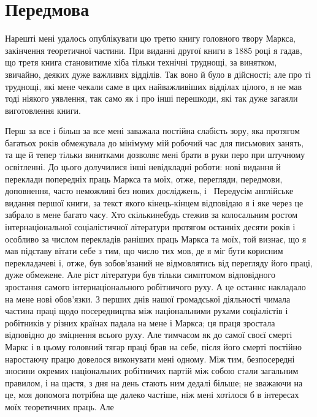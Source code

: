 \section*{Передмова}

Нарешті мені удалось опублікувати цю третю книгу головного
твору Маркса, закінчення теоретичної частини. При виданні
другої книги в 1885 році я гадав, що третя книга становитиме
хіба тільки технічні труднощі, за винятком, звичайно, деяких
дуже важливих відділів. Так воно й було в дійсності; але про ті
труднощі, які мене чекали саме в цих найважливіших відділах
цілого, я не мав тоді ніякого уявлення, так само як і про інші
перешкоди, які так дуже загаяли виготовлення книги.

Перш за все і більш за все мені заважала постійна слабість
зору, яка протягом багатьох років обмежувала до мінімуму мій
робочий час для письмових занять, та ще й тепер тільки винятками
дозволяє мені брати в руки перо при штучному освітленні.
До цього долучилися інші невідкладні роботи: нові видання й
переклади попередніх праць Маркса та моїх, отже, перегляди,
передмови, доповнення, часто неможливі без нових досліджень,
і~ Передусім англійське видання першої книги, за текст
якого кінець-кінцем відповідаю я і яке через це забрало в мене
багато часу. Хто скількинебудь стежив за колосальним ростом
інтернаціональної соціалістичної літератури протягом останніх
десяти років і особливо за числом перекладів раніших праць
Маркса та моїх, той визнає, що я мав підставу вітати себе
з тим, що число тих мов, де я міг бути корисним перекладачеві
і, отже, був зобов’язаний не відмовлятись від перегляду його
праці, дуже обмежене. Але ріст літератури був тільки симптомом
відповідного зростання самого інтернаціонального робітничого
руху. А це останнє накладало на мене нові обов’язки.
З перших днів нашої громадської діяльності чимала частина праці
щодо посередництва між національними рухами соціалістів і робітників
у різних країнах падала на мене і Маркса; ця праця зростала
відповідно до зміцнення всього руху. Але тимчасом як
до самої своєї смерті Маркс і в цьому головний тягар праці
брав на себе, після його смерті постійно наростаючу працю довелося
виконувати мені одному. Між тим, безпосередні зносини
окремих національних робітничих партій між собою стали загальним
правилом, і на щастя, з дня на день стають ним дедалі більше;
не зважаючи на це, моя допомога потрібна ще далеко частіше,
ніж мені хотілося б в інтересах моїх теоретичних праць. Але
\parbreak{}  %

